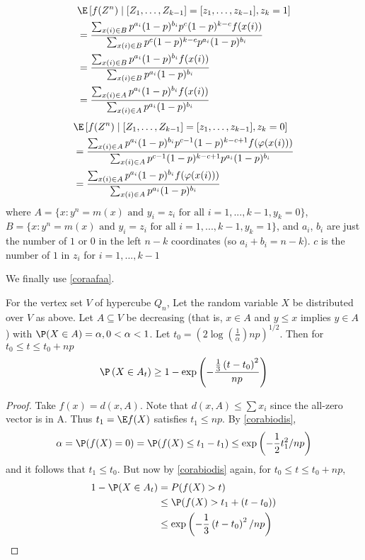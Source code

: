\documentclass{article}
\begin{document}
\begin{align*}
    &\E \left[ f (Z^n) \mid [Z _{1}, \ldots, Z _{ k -1}]=[z _{1}, \ldots, z_{ k -1}], z_{k}=1\right]\\
    & =\frac{\sum_{x(i)\in B} p^{a_i}(1-p)^{b_i}p^c(1-p)^{k-c}f(x(i))}{\sum_{x(i)\in B} p^c(1-p)^{k-c}p^{a_i}(1-p)^{b_i}} \\
    & = \frac{\sum_{x(i)\in B} p^{a_i}(1-p)^{b_i}f(x(i))}{\sum_{x(i)\in B} p^{a_i}(1-p)^{b_i}}\\
     & = \frac{\sum_{x(i)\in A} p^{a_i}(1-p)^{b_i}f(x(i))}{\sum_{x(i)\in A} p^{a_i}(1-p)^{b_i}}\\
\end{align*}
\begin{align*}
    &\E \left[ f (Z^n) \mid [Z _{1}, \ldots, Z _{ k -1}]=[z _{1}, \ldots, z_{ k -1}], z_{k}=0\right]\\
    & =\frac{\sum_{x(i)\in A} p^{a_i}(1-p)^{b_i}p^{c-1}(1-p)^{k-c+1}f(\varphi(x(i)))}{\sum_{x(i)\in A} p^{c-1}(1-p)^{k-c+1}p^{a_i}(1-p)^{b_i}} \\
    & = \frac{\sum_{x(i)\in A} p^{a_i}(1-p)^{b_i}f(\varphi(x(i)))}{\sum_{x(i)\in A} p^{a_i}(1-p)^{b_i}}
\end{align*}
where $A=\{x:y^n = m(x) \text{ and } y_i=z_i \text{ for all $i=1,...,k-1, y_k= 0$}\}$, $B=\{x:y^n = m(x) \text{ and } y_i=z_i \text{ for all $i=1,...,k-1, y_k= 1$}\}$, and $a_i$, $b_i$ are just the number of $1$ or $0$ in the left $n-k$ coordinates (so $a_i+b_i=n-k$).  $c$ is the number of $1$ in $z_i$ for $i=1,...,k-1$

We finally use \cref{coraafaa}.

\begin{cora}
For the vertex set $V$ of hypercube $Q _{ n }$, Let the random variable $X$ be distributed over $V$ as above. Let $A \subseteq V$ be decreasing (that is, $x \in A$ and $y \leq x$ implies $y \in A$ ) with $\P ( X \in A )=\alpha, 0<\alpha<1$.
Let $t_{0}=\left(2 \log \left(\frac{1}{\alpha}\right) n p \right)^{1 / 2}$. Then for $t _{0} \leq t \leq t _{0}+ np$
$$
\P \left( X \in A _{ t }\right) \geq 1-\exp \left(-\frac{\frac{1}{3}\left( t - t _{0}\right)^{2}}{ np} \right)
$$
\end{cora}
\begin{proof}
Take $f ( x )= d ( x , A )$. Note that $d ( x , A ) \leq \sum x _{ i }$ since the
all-zero vector is in A. Thus $t_{1}=\E f(X)$ satisfies $t_{1} \leq np$. By \cref{corabiodis},
$$
\alpha= \P( f ( X )=0)= \P ( f ( X ) \leq t _{1}- t _{1}) \leq \exp \left(-\frac{1}{2} t _{1}^{2} / np \right)
$$
and it follows that $t_{1} \leq t_{0}$. But now by \cref{corabiodis} again, for $t_{0} \leq t \leq t_{0}+ np$,
$$
\begin{aligned}
1-\P(X \in A_t)&=P(f(X)>t) \\
& \leq \P(f(X)>t_{1}+(t-t_{0})) \\
 & \leq \exp \left(-\frac{1}{3}\left(t-t_{0}\right)^{2} / n p\right)
\end{aligned}
$$
\end{proof}
\end{document}

